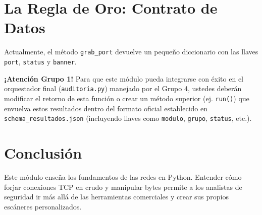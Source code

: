\documentclass[12pt,a4paper]{article}
\begin{document}
\section*{La Regla de Oro: Contrato de Datos}
Actualmente, el método \texttt{grab\_port} devuelve un pequeño diccionario con las llaves \texttt{port}, \texttt{status} y \texttt{banner}. 

\textbf{¡Atención Grupo 1!} Para que este módulo pueda integrarse con éxito en el orquestador final (\texttt{auditoria.py}) manejado por el Grupo 4, ustedes deberán modificar el retorno de esta función o crear un método superior (ej. \texttt{run()}) que envuelva estos resultados dentro del formato oficial establecido en \texttt{schema\_resultados.json} (incluyendo llaves como \texttt{modulo}, \texttt{grupo}, \texttt{status}, etc.).

\section*{Conclusión}
Este módulo enseña los fundamentos de las redes en Python. Entender cómo forjar conexiones TCP en crudo y manipular bytes permite a los analistas de seguridad ir más allá de las herramientas comerciales y crear sus propios escáneres personalizados.
\end{document}

